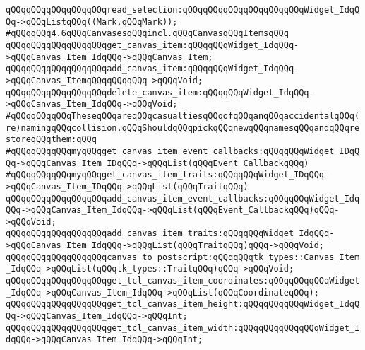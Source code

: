 \newline
\verb|qQQqqQQqqQQqqQQqqQQqread_selection:qQQqqQQqqQQqqQQqqQQqqQQqWidget_IdqQQq->qQQqListqQQq((Mark,qQQqMark));|\newline
\newline
\verb|#qQQqqQQq4.6qQQqCanvasesqQQqincl.qQQqCanvasqQQqItemsqQQq|\newline
\verb|qQQqqQQqqQQqqQQqqQQqget_canvas_item:qQQqqQQqWidget_IdqQQq->qQQqCanvas_Item_IdqQQq->qQQqCanvas_Item;|\newline
\newline
\verb|qQQqqQQqqQQqqQQqqQQqadd_canvas_item:qQQqqQQqWidget_IdqQQq->qQQqCanvas_ItemqQQqqQQqqQQq->qQQqVoid;|\newline
\verb|qQQqqQQqqQQqqQQqqQQqdelete_canvas_item:qQQqqQQqWidget_IdqQQq->qQQqCanvas_Item_IdqQQq->qQQqVoid;|\newline
\newline
\verb|#qQQqqQQqqQQqTheseqQQqareqQQqcasualtiesqQQqofqQQqanqQQqaccidentalqQQq(re)namingqQQqcollision.qQQqShouldqQQqpickqQQqnewqQQqnamesqQQqandqQQqrestoreqQQqthem:qQQq|\newline
\verb|#qQQqqQQqqQQqmyqQQqget_canvas_item_event_callbacks:qQQqqQQqWidget_IDqQQq->qQQqCanvas_Item_IDqQQq->qQQqList(qQQqEvent_CallbackqQQq)|\newline
\verb|#qQQqqQQqqQQqmyqQQqget_canvas_item_traits:qQQqqQQqWidget_IDqQQq->qQQqCanvas_Item_IDqQQq->qQQqList(qQQqTraitqQQq)|\newline
\newline
\verb|qQQqqQQqqQQqqQQqqQQqadd_canvas_item_event_callbacks:qQQqqQQqWidget_IdqQQq->qQQqCanvas_Item_IdqQQq->qQQqList(qQQqEvent_CallbackqQQq)qQQq->qQQqVoid;|\newline
\verb|qQQqqQQqqQQqqQQqqQQqadd_canvas_item_traits:qQQqqQQqWidget_IdqQQq->qQQqCanvas_Item_IdqQQq->qQQqList(qQQqTraitqQQq)qQQq->qQQqVoid;|\newline
\newline
\verb|qQQqqQQqqQQqqQQqqQQqcanvas_to_postscript:qQQqqQQqtk_types::Canvas_Item_IdqQQq->qQQqList(qQQqtk_types::TraitqQQq)qQQq->qQQqVoid;|\newline
\newline
\verb|qQQqqQQqqQQqqQQqqQQqget_tcl_canvas_item_coordinates:qQQqqQQqqQQqWidget_IdqQQq->qQQqCanvas_Item_IdqQQq->qQQqList(qQQqCoordinateqQQq);|\newline
\verb|qQQqqQQqqQQqqQQqqQQqget_tcl_canvas_item_height:qQQqqQQqqQQqWidget_IdqQQq->qQQqCanvas_Item_IdqQQq->qQQqInt;|\newline
\verb|qQQqqQQqqQQqqQQqqQQqget_tcl_canvas_item_width:qQQqqQQqqQQqqQQqWidget_IdqQQq->qQQqCanvas_Item_IdqQQq->qQQqInt;|\newline
